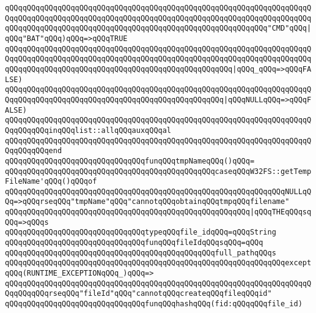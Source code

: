 \verb|qQQqqQQqqQQqqQQqqQQqqQQqqQQqqQQqqQQqqQQqqQQqqQQqqQQqqQQqqQQqqQQqqQQqqQQqqQQqqQQqqQQqqQQqqQQqqQQqqQQqqQQqqQQqqQQqqQQqqQQqqQQqqQQqqQQqqQQqqQQqqQQqqQQqqQQqqQQqqQQqqQQqqQQqqQQqqQQqqQQqqQQqqQQqqQQqqQQqqQQq"CMD"qQQq|\verb#|qQQq"BAT"qQQq)qQQq=>qQQqTRUE#\newline
\verb|qQQqqQQqqQQqqQQqqQQqqQQqqQQqqQQqqQQqqQQqqQQqqQQqqQQqqQQqqQQqqQQqqQQqqQQqqQQqqQQqqQQqqQQqqQQqqQQqqQQqqQQqqQQqqQQqqQQqqQQqqQQqqQQqqQQqqQQqqQQqqQQqqQQqqQQqqQQqqQQqqQQqqQQqqQQqqQQqqQQqqQQqqQQqqQQq|\verb#|qQQq_qQQq=>qQQqFALSE)#\newline
\verb|qQQqqQQqqQQqqQQqqQQqqQQqqQQqqQQqqQQqqQQqqQQqqQQqqQQqqQQqqQQqqQQqqQQqqQQqqQQqqQQqqQQqqQQqqQQqqQQqqQQqqQQqqQQqqQQqqQQqqQQq|\verb#|qQQqNULLqQQq=>qQQqFALSE)#\newline
\verb|qQQqqQQqqQQqqQQqqQQqqQQqqQQqqQQqqQQqqQQqqQQqqQQqqQQqqQQqqQQqqQQqqQQqqQQqqQQqqQQqinqQQqlist::allqQQqauxqQQqal|\newline
\verb|qQQqqQQqqQQqqQQqqQQqqQQqqQQqqQQqqQQqqQQqqQQqqQQqqQQqqQQqqQQqqQQqqQQqqQQqqQQqqQQqend|\newline
\newline
\verb|qQQqqQQqqQQqqQQqqQQqqQQqqQQqqQQqfunqQQqtmpNameqQQq()qQQq=|\newline
\verb|qQQqqQQqqQQqqQQqqQQqqQQqqQQqqQQqqQQqqQQqqQQqqQQqcaseqQQqW32FS::getTempFileName'qQQq()qQQqof|\newline
\verb|qQQqqQQqqQQqqQQqqQQqqQQqqQQqqQQqqQQqqQQqqQQqqQQqqQQqqQQqqQQqqQQqNULLqQQq=>qQQqrseqQQq"tmpName"qQQq"cannotqQQqobtainqQQqtmpqQQqfilename"|\newline
\verb|qQQqqQQqqQQqqQQqqQQqqQQqqQQqqQQqqQQqqQQqqQQqqQQqqQQqqQQq|\verb#|qQQqTHEqQQqsqQQq=>qQQqs#\newline
\newline
\verb|qQQqqQQqqQQqqQQqqQQqqQQqqQQqqQQqtypeqQQqfile_idqQQq=qQQqString|\newline
\newline
\verb|qQQqqQQqqQQqqQQqqQQqqQQqqQQqqQQqfunqQQqfileIdqQQqsqQQq=qQQq|\newline
\verb|qQQqqQQqqQQqqQQqqQQqqQQqqQQqqQQqqQQqqQQqqQQqqQQqfull_pathqQQqs|\newline
\verb|qQQqqQQqqQQqqQQqqQQqqQQqqQQqqQQqqQQqqQQqqQQqqQQqqQQqqQQqqQQqqQQqexceptqQQq(RUNTIME_EXCEPTIONqQQq_)qQQq=>|\newline
\verb|qQQqqQQqqQQqqQQqqQQqqQQqqQQqqQQqqQQqqQQqqQQqqQQqqQQqqQQqqQQqqQQqqQQqqQQqqQQqqQQqrseqQQq"fileId"qQQq"cannotqQQqcreateqQQqfileqQQqid"|\newline
\newline
\verb|qQQqqQQqqQQqqQQqqQQqqQQqqQQqqQQqfunqQQqhashqQQq(fid:qQQqqQQqfile_id)|\newline
